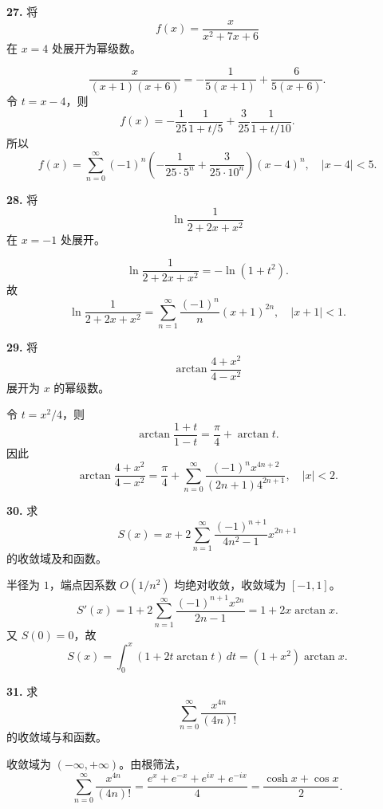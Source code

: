 \begin{problemblock}
\textbf{27.} 将
\[
f(x)=\frac{x}{x^2+7x+6}
\]
在 \(x=4\) 处展开为幂级数。
\end{problemblock}
\begin{solutionblock}
\[
\frac{x}{(x+1)(x+6)}=-\frac1{5(x+1)}+\frac6{5(x+6)}.
\]
令 \(t=x-4\)，则
\[
f(x)=-\frac1{25}\frac1{1+t/5}+\frac3{25}\frac1{1+t/10}.
\]
所以
\[
\boxed{
f(x)=\sum_{n=0}^{\infty}(-1)^n\left(-\frac1{25\cdot5^n}+\frac3{25\cdot10^n}\right)(x-4)^n},
\quad |x-4|<5.
\]
\end{solutionblock}

\begin{problemblock}
\textbf{28.} 将
\[
\ln\frac1{2+2x+x^2}
\]
在 \(x=-1\) 处展开。
\end{problemblock}
\begin{solutionblock}
\[
\ln\frac1{2+2x+x^2}=-\ln(1+t^2).
\]
故
\[
\boxed{
\ln\frac1{2+2x+x^2}
=\sum_{n=1}^{\infty}\frac{(-1)^n}{n}(x+1)^{2n}},
\quad |x+1|<1.
\]
\end{solutionblock}

\begin{problemblock}
\textbf{29.} 将
\[
\arctan\frac{4+x^2}{4-x^2}
\]
展开为 \(x\) 的幂级数。
\end{problemblock}
\begin{solutionblock}
令 \(t=x^2/4\)，则
\[
\arctan\frac{1+t}{1-t}=\frac{\pi}{4}+\arctan t.
\]
因此
\[
\boxed{
\arctan\frac{4+x^2}{4-x^2}
=\frac{\pi}{4}+\sum_{n=0}^{\infty}\frac{(-1)^nx^{4n+2}}{(2n+1)4^{2n+1}}},
\quad |x|<2.
\]
\end{solutionblock}

\begin{problemblock}
\textbf{30.} 求
\[
S(x)=x+2\sum_{n=1}^{\infty}\frac{(-1)^{n+1}}{4n^2-1}x^{2n+1}
\]
的收敛域及和函数。
\end{problemblock}
\begin{solutionblock}
半径为 \(1\)，端点因系数 \(O(1/n^2)\) 均绝对收敛，收敛域为 \([-1,1]\)。
\[
S'(x)=1+2\sum_{n=1}^{\infty}\frac{(-1)^{n+1}x^{2n}}{2n-1}
=1+2x\arctan x.
\]
又 \(S(0)=0\)，故
\[
S(x)=\int_0^x(1+2t\arctan t)\,dt
=\boxed{(1+x^2)\arctan x}.
\]
\end{solutionblock}

\begin{problemblock}
\textbf{31.} 求
\[
\sum_{n=0}^{\infty}\frac{x^{4n}}{(4n)!}
\]
的收敛域与和函数。
\end{problemblock}
\begin{solutionblock}
收敛域为 \((-\infty,+\infty)\)。由根筛法，
\[
\sum_{n=0}^{\infty}\frac{x^{4n}}{(4n)!}
=\frac{e^x+e^{-x}+e^{ix}+e^{-ix}}4
=\boxed{\frac{\cosh x+\cos x}{2}}.
\]
\end{solutionblock}

